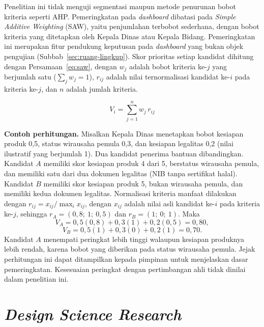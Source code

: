 Penelitian ini tidak menguji segmentasi maupun metode penurunan bobot kriteria seperti AHP. Pemeringkatan pada \textit{dashboard} dibatasi pada \textit{Simple Additive Weighting} (SAW), yaitu penjumlahan terbobot sederhana, dengan bobot kriteria yang ditetapkan oleh Kepala Dinas atau Kepala Bidang. Pemeringkatan ini merupakan fitur pendukung keputusan pada \textit{dashboard} yang bukan objek pengujian (Subbab~\ref{sec:ruang-lingkup}). Skor prioritas setiap kandidat dihitung dengan Persamaan~\eqref{eq:saw}, dengan $w_j$ adalah bobot kriteria ke-$j$ yang berjumlah satu ($\sum_j w_j = 1$), $r_{ij}$ adalah nilai ternormalisasi kandidat ke-$i$ pada kriteria ke-$j$, dan $n$ adalah jumlah kriteria.

\begin{equation}
  V_i = \sum_{j=1}^{n} w_j \, r_{ij}
  \label{eq:saw}
\end{equation}

\noindent\textbf{Contoh perhitungan.} Misalkan Kepala Dinas menetapkan bobot kesiapan produk 0,5, status wirausaha pemula 0,3, dan kesiapan legalitas 0,2 (nilai ilustratif yang berjumlah 1). Dua kandidat penerima bantuan dibandingkan. Kandidat $A$ memiliki skor kesiapan produk 4 dari 5, berstatus wirausaha pemula, dan memiliki satu dari dua dokumen legalitas (NIB tanpa sertifikat halal). Kandidat $B$ memiliki skor kesiapan produk 5, bukan wirausaha pemula, dan memiliki kedua dokumen legalitas. Normalisasi kriteria manfaat dilakukan dengan $r_{ij} = x_{ij}/\max_i x_{ij}$, dengan $x_{ij}$ adalah nilai asli kandidat ke-$i$ pada kriteria ke-$j$, sehingga $r_A = (0{,}8;\ 1;\ 0{,}5)$ dan $r_B = (1;\ 0;\ 1)$. Maka
\[
  V_A = 0{,}5(0{,}8) + 0{,}3(1) + 0{,}2(0{,}5) = 0{,}80,
\]
\[
  V_B = 0{,}5(1) + 0{,}3(0) + 0{,}2(1) = 0{,}70.
\]
Kandidat $A$ menempati peringkat lebih tinggi walaupun kesiapan produknya lebih rendah, karena bobot yang diberikan pada status wirausaha pemula. Jejak perhitungan ini dapat ditampilkan kepada pimpinan untuk menjelaskan dasar pemeringkatan. Kesesuaian peringkat dengan pertimbangan ahli tidak dinilai dalam penelitian ini.

\section{\textit{Design Science Research}}
\label{sec:dsr}

